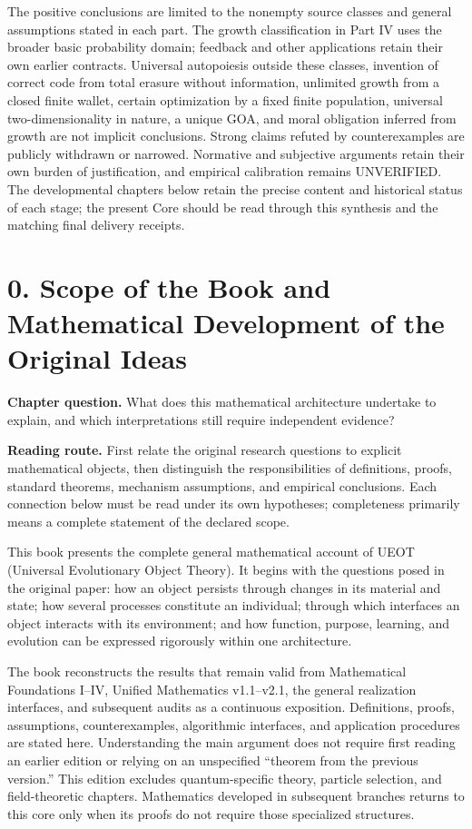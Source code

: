 \documentclass[
  english,
  11pt,
  oneside]{book}
\newcounter{none} %
\begin{document}
The positive conclusions are limited to the nonempty source classes and general assumptions stated in each part. The growth classification in Part IV uses the broader basic probability domain; feedback and other applications retain their own earlier contracts. Universal autopoiesis outside these classes, invention of correct code from total erasure without information, unlimited growth from a closed finite wallet, certain optimization by a fixed finite population, universal two-dimensionality in nature, a unique GOA, and moral obligation inferred from growth are not implicit conclusions. Strong claims refuted by counterexamples are publicly withdrawn or narrowed. Normative and subjective arguments retain their own burden of justification, and empirical calibration remains UNVERIFIED. The developmental chapters below retain the precise content and historical status of each stage; the present Core should be read through this synthesis and the matching final delivery receipts.

\chapter{0. Scope of the Book and Mathematical Development of the Original Ideas}\label{ch-0}

\textbf{Chapter question.} What does this mathematical architecture undertake to explain, and which interpretations still require independent evidence?

\textbf{Reading route.} First relate the original research questions to explicit mathematical objects, then distinguish the responsibilities of definitions, proofs, standard theorems, mechanism assumptions, and empirical conclusions. Each connection below must be read under its own hypotheses; completeness primarily means a complete statement of the declared scope.

This book presents the complete general mathematical account of UEOT (Universal Evolutionary Object Theory). It begins with the questions posed in the original paper: how an object persists through changes in its material and state; how several processes constitute an individual; through which interfaces an object interacts with its environment; and how function, purpose, learning, and evolution can be expressed rigorously within one architecture.

The book reconstructs the results that remain valid from Mathematical Foundations I--IV, Unified Mathematics v1.1--v2.1, the general realization interfaces, and subsequent audits as a continuous exposition. Definitions, proofs, assumptions, counterexamples, algorithmic interfaces, and application procedures are stated here. Understanding the main argument does not require first reading an earlier edition or relying on an unspecified ``theorem from the previous version.'' This edition excludes quantum-specific theory, particle selection, and field-theoretic chapters. Mathematics developed in subsequent branches returns to this core only when its proofs do not require those specialized structures.
\end{document}
